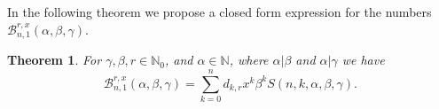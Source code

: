 \documentclass[12pt]{amsart}
\newtheorem{proof 1}{proof 1}
\newtheorem{theorem}{Theorem}[section]
\begin{document}
In the following theorem we propose a closed form expression for the numbers $\mathcal{B}^{r,x}_{n,1}(\alpha,\beta,\gamma)$.
\begin{theorem} \label{theorem:5}For $\gamma,\beta,r\in\mathbb{N}_0$, and $\alpha\in \mathbb{N}$, where ${\alpha}|\beta$ and ${\alpha}|\gamma$ we have
		\begin{equation}\label{definition:100}
		\mathcal{B}^{r,x}_{n,1}(\alpha,\beta,\gamma)=\sum_{k=0}^{n}d_{k,r}x^{k}\beta^{k} S(n,k,\alpha,\beta,\gamma).
	\end{equation}
\end{theorem}
\end{document}
